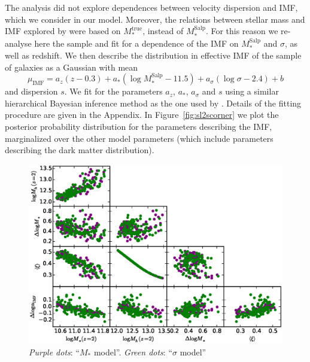\documentclass[usenatbib, letters]{mnras}
\def\mtrue{M_*^{\mathrm{true}}}
\def\msalp{M_*^{\mathrm{Salp}}}
\def\Fref#1{Figure~\ref{#1}\xspace}
\begin{document}
The \citet{Son++15} analysis did not explore dependences between velocity dispersion and IMF, which we consider in our model.
Moreover, the relations between stellar mass and IMF explored by \citet{Son++15} were based on $\mtrue$, instead of $\msalp$.
For this reason we re-analyse here the \citet{Son++15} sample and fit for a dependence of the IMF on $\msalp$ and $\sigma$, as well as redshift. We then describe the distribution in effective IMF of the \citet{Son++15} sample of galaxies as a Gaussian with mean
\begin{equation}\label{eq:sl2sfit}
\mu_{\mathrm{IMF}} = a_z(z - 0.3) + a_*(\log{\msalp} - 11.5) + a_\sigma(\log{\sigma} - 2.4) + b
\end{equation}
and dispersion $s$. We fit for the parameters $a_z$, $a_*$, $a_\sigma$ and $s$ using a similar hierarchical Bayesian inference method as the one used by \citet{Son++15}.
Details of the fitting procedure are given in the Appendix.
In \Fref{fig:sl2scorner} we plot the posterior probability distribution for the parameters describing the IMF, marginalized over the other model parameters (which include parameters describing the dark matter distribution).
%
\begin{figure}
 \includegraphics[width=\textwidth]{cornerplot.eps}
 \caption{{\em Purple dots}: ``$M_*$ model''. {\em Green dots}: ``$\sigma$ model''
}
 \label{fig:cornerplot}
\end{figure}



\end{document}
